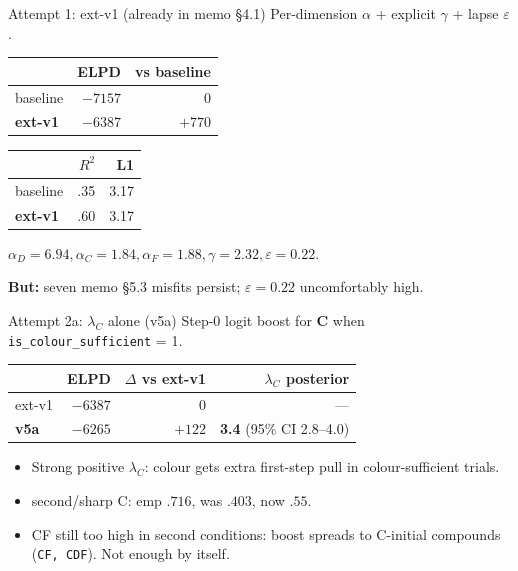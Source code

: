 \documentclass[10pt,aspectratio=169]{beamer}
\newcommand{\hl}[1]{{\color{hlblue}\textbf{#1}}}
\newcommand{\bad}[1]{{\color{hlred}#1}}
\newcommand{\good}[1]{{\color{hlgreen}#1}}
\begin{document}
\begin{frame}{Attempt 1: ext-v1 (already in memo \S4.1)}
Per-dimension $\alpha$ + explicit $\gamma$ + lapse $\varepsilon$.

\vspace{0.5em}
\begin{center}
\begin{tabular}{lrr}
\toprule
& ELPD & vs baseline\\
\midrule
baseline & $-7157$ & 0 \\
\hl{ext-v1}  & \hl{$-6387$} & \hl{$+770$} \\
\bottomrule
\end{tabular}
\quad
\begin{tabular}{lrr}
\toprule
& $R^2$ & L1\\
\midrule
baseline  & .35 & 3.17 \\
\hl{ext-v1}   & .60 & 3.17 \\
\bottomrule
\end{tabular}
\end{center}

\vspace{0.5em}
$\alpha_D = 6.94, \alpha_C = 1.84, \alpha_F = 1.88, \gamma = 2.32, \varepsilon = 0.22$.

\vspace{0.5em}
\hl{But:} seven memo \S5.3 misfits persist; $\varepsilon = 0.22$ uncomfortably high.
\end{frame}

\begin{frame}{Attempt 2a: $\lambda_C$ alone (v5a)}
Step-0 logit boost for \textbf{C} when \texttt{is\_colour\_sufficient} = 1.

\vspace{0.5em}
\begin{center}
\begin{tabular}{lrrr}
\toprule
& ELPD & $\Delta$ vs ext-v1 & $\lambda_C$ posterior\\
\midrule
ext-v1 & $-6387$ & 0 & --- \\
\hl{v5a}    & \hl{$-6265$} & \hl{$+122$}  & \hl{3.4} (95\% CI 2.8--4.0) \\
\bottomrule
\end{tabular}
\end{center}

\vspace{0.5em}
\begin{itemize}\itemsep0.2em
  \item Strong positive $\lambda_C$: colour gets extra first-step pull in colour-sufficient trials.
  \item \good{second/sharp C}: emp $.716$, was $.403$, now $.55$.
  \item \bad{CF still too high in second conditions}: boost spreads to C-initial compounds (\texttt{CF, CDF}). Not enough by itself.
\end{itemize}
\end{frame}
\end{document}
